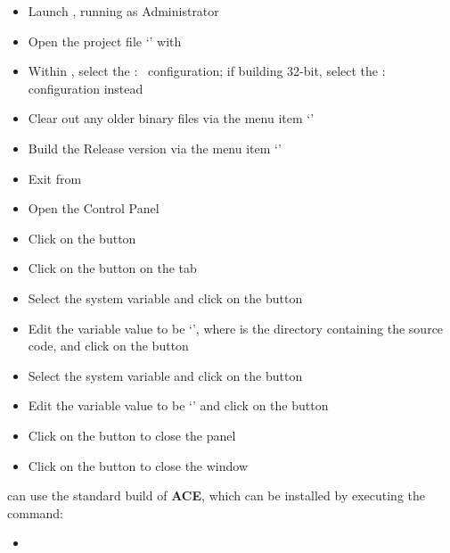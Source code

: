 \begin{itemize}
\item Launch , running as Administrator
\item\exSp{}Open the project file
`' with 
\item\exSp{}Within , select the  :\ 
configuration; if building 32-bit, select the  :\ 
configuration instead
\item\exSp{}Clear out any older binary files via the menu item
`'
\item\exSp{}Build the Release version via the menu item
`'
\item\exSp{}Exit from 
\item\exSp{}Open the  Control Panel
\item\exSp{}Click on the  button
\item\exSp{}Click on the  button on the 
tab
\item\exSp{}Select the  system variable and click on the
 button 
\item\exSp{}Edit the variable value to be
`', where 
is the directory containing the \mplusm{} source code, and click on the  button
\item\exSp{}Select the  system variable and click on
the  button 
\item\exSp{}Edit the variable value to be
`' and
click on the  button
\item\exSp{}Click on the  button to close the 
panel
\item\exSp{}Click on the  button to close the 
window
\end{itemize}
\tertiaryEnd
{}
\mplusm{} can use the standard build of \textbf{ACE}, which can be installed by executing the
command:
\begin{itemize}
\item {}
\end{itemize}
